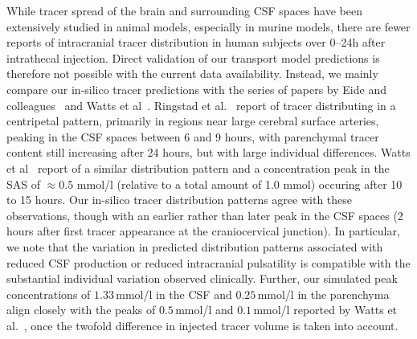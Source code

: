 \documentclass[fleqn,10pt]{wlscirep}
\begin{document}
While tracer spread of the brain and surrounding CSF spaces have been
extensively studied in animal models, especially in murine models,
there are fewer reports of intracranial tracer distribution in human
subjects over 0--24h after intrathecal injection. Direct validation of
our transport model predictions is therefore not possible with the
current data availability. Instead, we mainly compare our in-silico
tracer predictions with the series of papers by Eide and
colleagues~\cite{ringstad2017glymphatic, ringstad2018brain,
  eide2021sleep, eide2024functional} and Watts et
al~\cite{watts2019measuring}. Ringstad et al.~\cite{ringstad2018brain}
report of tracer distributing in a centripetal pattern, primarily in
regions near large cerebral surface arteries, peaking in the CSF
spaces between 6 and 9 hours, with parenchymal tracer content still
increasing after 24 hours, but with large individual
differences. Watts et al~\cite{watts2019measuring} report of a similar
distribution pattern and a concentration peak in the SAS of
$\approx$0.5 mmol/l (relative to a total amount of 1.0 mmol) occuring
after 10 to 15 hours. Our in-silico tracer distribution patterns agree
with these observations, though with an earlier rather than later peak
in the CSF spaces (2 hours after first tracer appearance at the
craniocervical junction). In particular, we note that the variation in
predicted distribution patterns associated with reduced CSF production
or reduced intracranial pulsatility is compatible with the substantial
individual variation observed clinically. Further, our simulated peak concentrations of $1.33\,$mmol/l in the CSF and $0.25\,$mmol/l in the parenchyma align closely with the peaks of $0.5\,$mmol/l and $0.1\,$mmol/l reported by Watts et al.~\cite{watts2019measuring}, once the twofold difference in injected tracer volume is taken into account.
\end{document}
